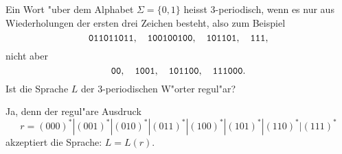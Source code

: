 Ein Wort "uber dem Alphabet $\Sigma=\{0,1\}$ heisst
3-periodisch, wenn es nur aus Wiederholungen der ersten drei Zeichen besteht,
also zum Beispiel
\[
\text{\tt 011011011},\quad
\text{\tt 100100100},\quad
\text{\tt 101101},\quad
\text{\tt 111},
\]
nicht aber
\[
\text{\tt 00},\quad
\text{\tt 1001},\quad
\text{\tt 101100},\quad
\text{\tt 111000}.
\]
Ist die Sprache $L$ der 3-periodischen W"orter regul"ar?

\begin{loesung}
Ja, denn der regul"are Ausdruck
\[
r=(000)^*|
(001)^*|
(010)^*|
(011)^*|
(100)^*|
(101)^*|
(110)^*|
(111)^*
\]
akzeptiert die Sprache: $L=L(r)$.
\end{loesung}

